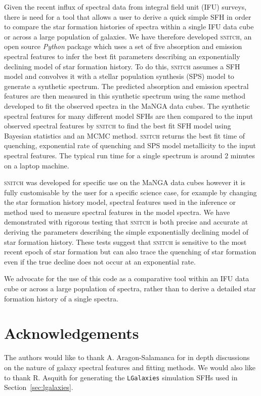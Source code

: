 \documentclass[useAMS,usenatbib]{mn2e}
\begin{document}
Given the recent influx of spectral data from integral field unit (IFU) surveys, there is need for a tool that allows a user to derive a quick simple SFH in order to compare the star formation histories of spectra within a single IFU data cube or across a large population of galaxies. We have therefore developed \textsc{snitch}, an open source \emph{Python} package which uses a set of five absorption and emission spectral features to infer the best fit parameters describing an exponentially declining model of star formation history. To do this, \textsc{snitch} assumes a SFH model and convolves it with a stellar population synthesis (SPS) model to generate a synthetic spectrum. The predicted absorption and emission spectral features are then measured in this synthetic spectrum using the same method developed to fit the observed spectra in the MaNGA data cubes. The synthetic spectral features for many different model SFHs are then compared to the input observed spectral features by \textsc{snitch} to find the best fit SFH model using Bayesian statistics and an MCMC method. \textsc{snitch} returns the best fit time of quenching, exponential rate of quenching and SPS model metallicity to the input spectral features. The typical run time for a single spectrum is around 2 minutes on a laptop machine. 

\textsc{snitch} was developed for specific use on the MaNGA data cubes however it is fully customisable by the user for a specific science case, for example by changing the star formation history model, spectral features used in the inference or method used to measure spectral features in the model spectra. We have demonstrated with rigorous testing that \textsc{snitch} is both precise and accurate at deriving the parameters describing the simple exponentially declining model of star formation history. These tests suggest that \textsc{snitch} is sensitive to the most recent epoch of star formation but can also trace the quenching of star formation even if the true decline does not occur at an exponential rate.  

We advocate for the use of this code as a comparative tool within an IFU data cube or across a large population of spectra, rather than to derive a detailed star formation history of a single spectra. 

\section*{Acknowledgements}

The authors would like to thank A. Aragon-Salamanca for in depth discussions on the nature of galaxy spectral features and fitting methods. We would also like to thank R. Asquith for generating the \texttt{LGalaxies} simulation SFHs used in Section~\ref{sec:lgalaxies}.
\end{document}
